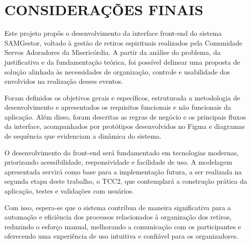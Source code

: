 \chapter{CONSIDERAÇÕES FINAIS}

Este projeto propôs o desenvolvimento da interface front-end do sistema SAMGestor, voltado à gestão de retiros espirituais realizados pela Comunidade Servos Adoradores da Misericórdia. A partir da análise do problema, da justificativa e da fundamentação teórica, foi possível delinear uma proposta de solução alinhada às necessidades de organização, controle e usabilidade dos envolvidos na realização desses eventos.

Foram definidos os objetivos gerais e específicos, estruturada a metodologia de desenvolvimento e apresentados os requisitos funcionais e não funcionais da aplicação. Além disso, foram descritas as regras de negócio e os principais fluxos da interface, acompanhados por protótipos desenvolvidos no Figma e diagramas de sequência que evidenciam a dinâmica do sistema.

O desenvolvimento do front-end será fundamentado em tecnologias modernas, priorizando acessibilidade, responsividade e facilidade de uso. A modelagem apresentada servirá como base para a implementação futura, a ser realizada na segunda etapa deste trabalho, o TCC2, que contemplará a construção prática da aplicação, testes e validações com usuários.

Com isso, espera-se que o sistema contribua de maneira significativa para a automação e eficiência dos processos relacionados à organização dos retiros, reduzindo o esforço manual, melhorando a comunicação com os participantes e oferecendo uma experiência de uso intuitiva e confiável para os organizadores.


